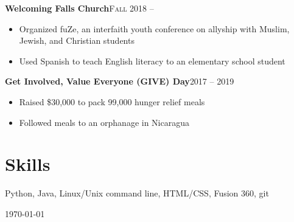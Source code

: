 \documentclass[12pt, a4paper]{article}
\begin{document}

\textbf{Welcoming Falls Church}\hfill\textsc{Fall 2018 --}\\
\begin{itemize}
    \vspace{-8mm}
    \item Organized fuZe, an interfaith youth conference on allyship with Muslim, Jewish, and Christian students
    \item Used Spanish to teach English literacy to an elementary school student
\end{itemize}

\textbf{Get Involved, Value Everyone (GIVE) Day}\hfill\textsc{2017 -- 2019}\\
\begin{itemize}
    \vspace{-8mm}
    \item Raised \$30,000 to pack 99,000 hunger relief meals
    \item Followed meals to an orphanage in Nicaragua
\end{itemize}

\vspace{-8mm}
\section*{Skills}
\vspace{-2mm}
Python, Java, Linux/Unix command line, HTML/CSS, Fusion 360, git\\

\vspace{-4mm}
\begin{center}
{\scriptsize\today\- }
\end{center}
\end{document}
